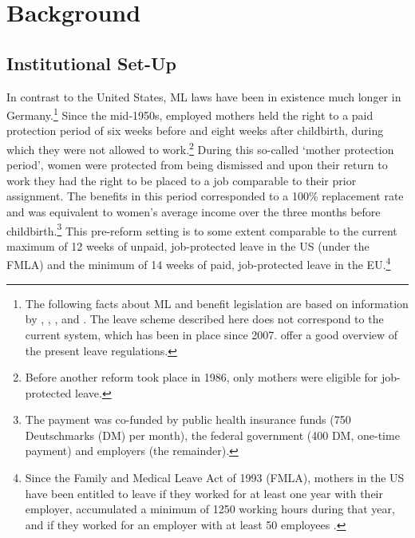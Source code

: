\bigskip
\section{Background}\label{sec_mlch:background}
\subsection{Institutional Set-Up}
In contrast to the United States, ML laws have been in existence much longer in Germany.\footnote{The following facts about ML and benefit legislation are based on information by \cite{DIW2002}, \cite{schonberg2014expansions}, \cite{Dustmann2012}, and \cite{zmarzlik1999mutterschutzgesetz}. The leave scheme described here does not correspond to the current system, which has been in place since 2007. \cite{Kluve2013} offer a good overview of the present leave regulations.} Since the mid-1950s, employed mothers held the right to a paid protection period of six weeks before and eight weeks after childbirth, during which they were not allowed to work.\footnote{Before another reform took place in 1986, only mothers were eligible for job-protected leave.} During this so-called `mother protection period', women were protected from being dismissed and upon their return to work they had the right to be placed
to a job comparable to their prior assignment. The benefits in this period corresponded to a 100\% replacement rate and was equivalent to women's average income over the three months before childbirth.\footnote{The payment was co-funded by public health insurance funds (750 Deutschmarks (DM) per month), the federal government (400 DM, one-time payment) and employers (the remainder).} This pre-reform setting is to some extent comparable to the current maximum of 12 weeks of unpaid, job-protected leave in the US (under the FMLA) and the minimum of 14 weeks of paid, job-protected leave in the EU.\footnote{Since the Family and Medical Leave Act of 1993 (FMLA), mothers in the US have been entitled to leave if they worked for at least one year with their employer, accumulated a minimum of 1250 working hours during that year, and if they worked for an employer with at least 50 employees \citep{baum2003effect}.} 

